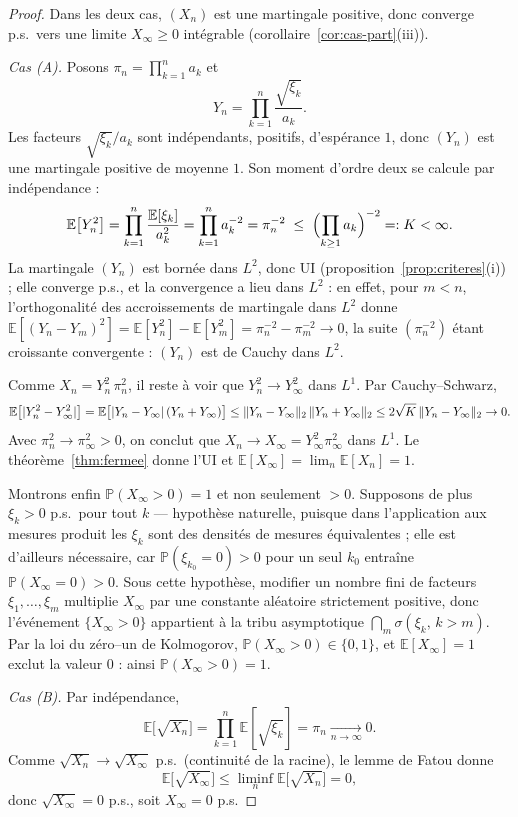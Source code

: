 \documentclass[11pt,a4paper]{article}
\theoremstyle{plain}
\theoremstyle{definition}
\theoremstyle{remark}
\newcommand{\E}{\mathbb{E}}
\newcommand{\Prob}{\mathbb{P}}
\DeclarePairedDelimiter{\abs}{\lvert}{\rvert}
\DeclarePairedDelimiter{\norm}{\lVert}{\rVert}
\begin{document}
\begin{proof}
Dans les deux cas, $(X_n)$ est une martingale positive, donc converge p.s.\ vers
une limite $X_\infty \ge 0$ intégrable (corollaire~\ref{cor:cas-part}(iii)).

\medskip
\noindent\emph{Cas (A).} Posons $\pi_n = \prod_{k=1}^n a_k$ et
\[
Y_n = \prod_{k=1}^{n} \frac{\sqrt{\xi_k}}{a_k}.
\]
Les facteurs $\sqrt{\xi_k}/a_k$ sont indépendants, positifs, d'espérance $1$,
donc $(Y_n)$ est une martingale positive de moyenne $1$. Son moment d'ordre
deux se calcule par indépendance :
\[
\E\bigl[Y_n^2\bigr]
= \prod_{k=1}^{n} \frac{\E[\xi_k]}{a_k^2}
= \prod_{k=1}^{n} a_k^{-2}
= \pi_n^{-2}
\;\le\; \Bigl(\prod_{k\ge 1} a_k\Bigr)^{-2} =: K < \infty.
\]
La martingale $(Y_n)$ est bornée dans $L^2$, donc UI
(proposition~\ref{prop:criteres}(i)) ; elle converge p.s., et la convergence a
lieu dans $L^2$ : en effet, pour $m < n$, l'orthogonalité des accroissements de
martingale dans $L^2$ donne
$\E[(Y_n - Y_m)^2] = \E[Y_n^2] - \E[Y_m^2] = \pi_n^{-2} - \pi_m^{-2} \to 0$,
la suite $(\pi_n^{-2})$ étant croissante convergente : $(Y_n)$ est de Cauchy
dans $L^2$.

Comme $X_n = Y_n^2\, \pi_n^2$, il reste à voir que $Y_n^2 \to Y_\infty^2$ dans
$L^1$. Par Cauchy--Schwarz,
\[
\E\bigl[\abs{Y_n^2 - Y_\infty^2}\bigr]
= \E\bigl[\abs{Y_n - Y_\infty}\,(Y_n + Y_\infty)\bigr]
\le \norm{Y_n - Y_\infty}_2 \,\norm{Y_n + Y_\infty}_2
\le 2\sqrt{K}\,\norm{Y_n - Y_\infty}_2 \to 0.
\]
Avec $\pi_n^2 \to \pi_\infty^2 > 0$, on conclut que $X_n \to X_\infty =
Y_\infty^2 \pi_\infty^2$ dans $L^1$. Le théorème~\ref{thm:fermee} donne l'UI et
$\E[X_\infty] = \lim_n \E[X_n] = 1$.

Montrons enfin $\Prob(X_\infty > 0) = 1$ et non seulement $> 0$. Supposons de
plus $\xi_k > 0$ p.s.\ pour tout $k$ --- hypothèse naturelle, puisque dans
l'application aux mesures produit les $\xi_k$ sont des densités de mesures
équivalentes ; elle est d'ailleurs nécessaire, car $\Prob(\xi_{k_0} = 0) > 0$
pour un seul $k_0$ entraîne $\Prob(X_\infty = 0) > 0$. Sous cette hypothèse,
modifier un nombre fini de facteurs $\xi_1, \dots, \xi_m$ multiplie $X_\infty$
par une constante aléatoire strictement positive, donc l'événement
$\{X_\infty > 0\}$ appartient à la tribu asymptotique
$\bigcap_m \sigma(\xi_k,\, k > m)$. Par la loi du zéro--un de Kolmogorov,
$\Prob(X_\infty > 0) \in \{0, 1\}$, et $\E[X_\infty] = 1$ exclut la valeur
$0$ : ainsi $\Prob(X_\infty > 0) = 1$.

\medskip
\noindent\emph{Cas (B).} Par indépendance,
\[
\E\bigl[\sqrt{X_n}\bigr] = \prod_{k=1}^{n} \E[\sqrt{\xi_k}]
= \pi_n \xrightarrow[n\to\infty]{} 0.
\]
Comme $\sqrt{X_n} \to \sqrt{X_\infty}$ p.s.\ (continuité de la racine), le
lemme de Fatou donne
\[
\E\bigl[\sqrt{X_\infty}\bigr] \le \liminf_n \E\bigl[\sqrt{X_n}\bigr] = 0,
\]
donc $\sqrt{X_\infty} = 0$ p.s., soit $X_\infty = 0$ p.s.
\end{proof}
\end{document}
